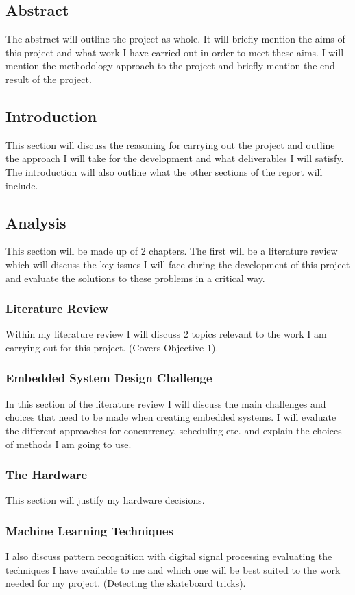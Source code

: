 \subsection{Abstract}\label{tor:rptabstract}
The abstract will outline the project as whole. It will briefly mention the aims of this project and what work I have carried out in order to meet these aims. I will mention the methodology approach to the project and briefly mention the end result of the project.
\subsection{Introduction}\label{tor:rptintro}
This section will discuss the reasoning for carrying out the project and outline the approach I will take for the development and what deliverables I will satisfy. The introduction will also outline what the other sections of the report will include.
\subsection{Analysis}\label{tor:rptanalysis}
This section will be made up of 2 chapters. The first will be a literature review which will discuss the key issues I will face during the development of this project and evaluate the solutions to these problems in a critical way.
\subsubsection{Literature Review}\label{tor:rptlitreview}
Within my literature review I will discuss 2 topics relevant to the work I am carrying out for this project. (Covers Objective 1).
\subsubsection{Embedded System Design Challenge}\label{tor:rptesdesign}
In this section of the literature review I will discuss the main challenges and choices that need to be made when creating embedded systems. I will evaluate the different approaches for concurrency, scheduling etc. and explain the choices of methods I am going to use.
\subsubsection{The Hardware}\label{tor:rpthardware}
This section will justify my hardware decisions.
\subsubsection{Machine Learning Techniques}\label{tor:rptmachinelearning}
I also discuss pattern recognition with digital signal processing evaluating the techniques I have available to me and which one will be best suited to the work needed for my project. (Detecting the skateboard tricks).
